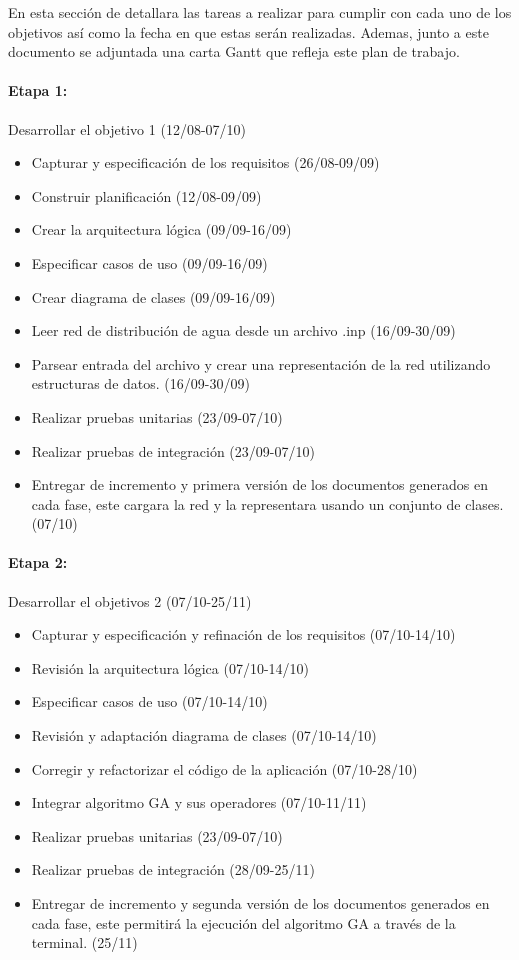 \documentclass[11pt,letterpaper]{article}
\begin{document}

En esta sección de detallara las tareas a realizar para cumplir con cada uno de los objetivos así como la fecha en que estas serán realizadas. Ademas, junto a este documento se adjuntada una carta Gantt que refleja este plan de trabajo.

\paragraph{Etapa 1:} Desarrollar el objetivo 1 (12/08-07/10)
\begin{itemize}
	\item Capturar y especificación de los requisitos (26/08-09/09)
	\item Construir planificación (12/08-09/09)
	\item Crear la arquitectura lógica (09/09-16/09)
	\item Especificar casos de uso (09/09-16/09)
	\item Crear diagrama de clases (09/09-16/09)
	\item Leer red de distribución de agua desde un archivo .inp (16/09-30/09)
	\item Parsear entrada del archivo y crear una representación de la red utilizando estructuras de datos. (16/09-30/09)
	\item Realizar pruebas unitarias (23/09-07/10)
	\item Realizar pruebas de integración (23/09-07/10)
	\item Entregar de incremento y primera versión de los documentos generados en cada fase, este cargara la red y la representara usando un conjunto de clases. (07/10)
\end{itemize}

\paragraph{Etapa 2:} Desarrollar el objetivos 2 (07/10-25/11)
\begin{itemize}
	\item Capturar y especificación y refinación de los requisitos (07/10-14/10)
	\item Revisión la arquitectura lógica (07/10-14/10)
	\item Especificar casos de uso (07/10-14/10)
	\item Revisión y adaptación diagrama de clases (07/10-14/10)
	\item Corregir y refactorizar el código de la aplicación (07/10-28/10)
	\item Integrar algoritmo GA y sus operadores (07/10-11/11)
	\item Realizar pruebas unitarias (23/09-07/10)
	\item Realizar pruebas de integración (28/09-25/11)
	\item Entregar de incremento y segunda versión de los documentos generados en cada fase, este permitirá la ejecución del algoritmo GA a través de la terminal. (25/11)
\end{itemize}
\end{document}
